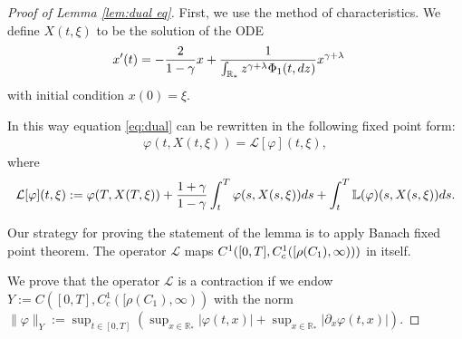 \documentclass[11pt]{article}
\numberwithin{equation}{section}
\theoremstyle{plain}
\newcommand{\der}{\textup{d}}
\begin{document}
\begin{proof}[Proof of Lemma \ref{lem:dual eq}]
First, we use the method of characteristics. 
We define $X(t, \xi)$ to be the solution of the ODE
\begin{align*}
   x'(t) &= -
\frac{2}{1-\gamma}x  + \frac{1}{\int_{\mathbb R_*}z^{\gamma +\lambda}\Phi_1(t,\der z)}  x^{\gamma + \lambda}
\end{align*} with initial condition $x(0)=\xi. $

In this way equation \eqref{eq:dual} can be rewritten in the following fixed point form: 
\begin{align} \label{eq:fixed point L}
  \varphi(t, X(t, \xi))  =   \mathcal L[\varphi]  (t, \xi),
  \end{align}
  where 
  \begin{align*} 
  \mathcal L [\varphi] (t, \xi) :=\varphi(T, X(T, \xi))  + \frac{1+\gamma}{1-\gamma}   \int_t^T  \varphi(s, X(s, \xi)) \der s 
+\int_t^T \mathbb{L}(\varphi)(s, X(s , \xi)) \der s. 
\end{align*}

Our strategy for proving the statement of the lemma is to apply Banach fixed point theorem. The operator $\mathcal L$ maps  ${C}^{1}([0,T],\textup{C}^{1}_{c}([\rho(C_{1}), \infty ) ))$ in itself. 

We prove that the operator $\mathcal L$ is a contraction if we endow $Y:= C([0,T], C^1_c([\rho(C_{1}), \infty ))$ with the norm $\| \varphi \|_Y := \sup_{ t \in [0, T] } \left(  \sup_{ x \in \mathbb R_*} |\varphi(t, x) |+ \sup_{x \in \mathbb R_*} | \partial_x \varphi(t, x) | \right) $. 


\end{proof}
\end{document}
